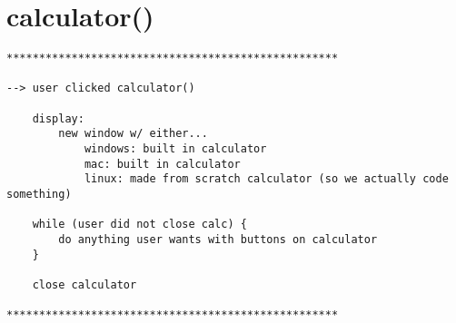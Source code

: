 \documentclass[12pt]{article}
\begin{document}
\newpage

\section{calculator()}
    \begin{verbatim}
***************************************************

--> user clicked calculator()

    display:
        new window w/ either...
            windows: built in calculator
            mac: built in calculator
            linux: made from scratch calculator (so we actually code something)

    while (user did not close calc) {
        do anything user wants with buttons on calculator
    }
    
    close calculator

***************************************************
    \end{verbatim}

\newpage
\end{document}
